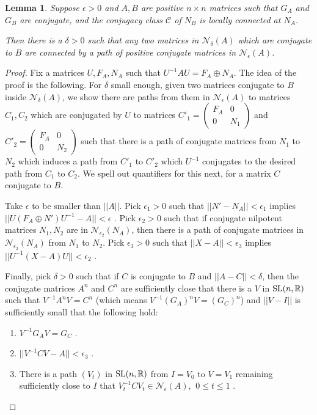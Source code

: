 \documentclass{amsart}
\newtheorem{lemma}[theorem]{Lemma}
\theoremstyle{definition}
\theoremstyle{remark}
\numberwithin{equation}{section}
\begin{document}
{{\begin{lemma} \label{reduction} Suppose $\epsilon >0$ and $A,B$ are positive 
$n\times n$ matrices such that $G_A$ and $G_B$ are conjugate,  
and the conjugacy class $\mathcal C$ of 
$N_B$ is locally connected at $N_A$. 

Then there is a $\delta >0$ such that any two 
matrices in $\mathcal N_{\delta}(A)$ which are conjugate to 
$B$ are connected by a 
path of positive conjugate matrices 
in $\mathcal N_{\epsilon}(A)$. 
\end{lemma} 

\begin{proof} 
Fix a matrices $U,F_A,N_A$ such that $U^{-1}AU=F_A \oplus N_A$. 
The idea of the proof is the following. 
For $\delta $ small enough, 
given two matrices conjugate to $B$ inside 
$\mathcal N_{\delta}(A)$, we show there are paths from them in 
  $\mathcal N_{\epsilon}(A)$ to matrices
$C_1,C_2$  which are 
conjugated by $U$ to matrices 
$C'_1=\left(
\begin{smallmatrix} F_A & 0 \\ 0 & N_1 
\end{smallmatrix}
\right) $ 
and 
$C'_2=\left(
\begin{smallmatrix} F_A & 0 \\ 0 & N_2 
\end{smallmatrix}
\right) $ 
such that there is a path of conjugate 
matrices from $N_1$ to $N_2$ which induces 
a path from $C'_1$ to $C'_2$ which 
$U^{-1}$ conjugates to the desired path 
from $C_1$ to $C_2$. We spell out quantifiers for this next, 
for a matrix $C$ conjugate to $B$.  



Take $\epsilon $ to be smaller than $||A||$. 
Pick $\epsilon_1>0$ such that 
$||N'-N_A||<\epsilon_1$ implies $||U(F_A\oplus N')U^{-1}-A||< \epsilon$ . 
Pick $\epsilon_2>0$ such that if conjugate nilpotent matrices 
$N_1,N_2$ are in $\mathcal N_{\epsilon_2}(N_A)$, then there is a path 
of conjugate matrices in $\mathcal N_{\epsilon_2}(N_A)$ from 
$N_1$ to $N_2$. Pick $\epsilon_3>0$ such that  
$||X-A||<\epsilon_3$ implies $||U^{-1}(X-A)U||<\epsilon_2$ .  

Finally, pick $\delta >0$ such that if $C$ is conjugate to 
$B$ and  $||A-C||<\delta$, then the conjugate matrices 
$A^n$ and $C^n$ are sufficiently close that there is a 
$V$ in $\textnormal{SL}(n,\mathbb R)$ such that $V^{-1}A^nV=
C^n$ (which means 
$V^{-1}(G_A)^nV=
(G_C)^n$)  and $||V-I||$ is sufficiently small that the following 
hold: 
\begin{enumerate} 
\item 
$V^{-1}G_AV=G_C$ . 
\item 
$||V^{-1}CV-A||<\epsilon_3$ . 
\item 
There is a path $(V_t)$ in 
$\textnormal{SL}(n,\mathbb R)$ from $I=V_0$ to
$V=V_1$ remaining sufficiently close 
to $I$ that 
$V_t^{-1}CV_t\in \mathcal N_{\epsilon}(A)$, $\ 0\leq t\leq 1$ . 
\end{enumerate} 


\end{proof}}}
\end{document}
